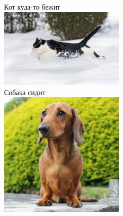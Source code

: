 \documentclass{article}
\begin{document}
Кот куда-то бежит \\
\includegraphics[width=6cm]{cat.jpg} \\
Собака сидит \\
\includegraphics[width=6cm]{dog.jpg}
\end{document}
